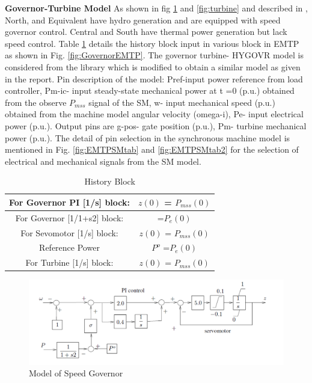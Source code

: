 \documentclass{report}
\begin{document}
\textbf{Governor-Turbine Model}
As shown in fig \ref{fig:Speed} and \ref{fig:turbine} and described in \cite{van2015test}, North, and Equivalent have hydro generation and are equipped with speed governor control. Central and South have thermal power generation but lack speed control. Table \ref{tab:HistoryGovTurbine} details the history block input in various block in EMTP as shown in Fig. \ref{fig:GovernorEMTP}. The governor turbine- HYGOVR model is considered from the library which is modified to obtain a similar model as given in the report. Pin description of the model: Pref-input power reference from load controller, Pm-ic- input steady-state mechanical power at t =0 (p.u.) obtained from the observe $P_{mss}$ signal of the SM, w- input mechanical speed (p.u.) obtained from the machine model angular velocity (omega-i), Pe- input electrical power (p.u.). Output pins are g-pos- gate position (p.u.), Pm- turbine mechanical power (p.u.). The detail of pin selection in the synchronous machine model is mentioned in Fig. \ref{fig:EMTPSMtab} and \ref{fig:EMTPSMtab2} for the selection of electrical and mechanical signals from the SM model. 

 \begin{table}[H]
\centering
\caption{History Block}
\begin{tabular}{|c|c|}
    \hline
For Governor PI [1/s] block: & $z(0)$ = $P_{mss}(0) $ \\
    \hline
For Governor  [1/1+s2] block: & =$P_e(0)$  \\
\hline
For Sevomotor  [1/s] block: & $z(0)$ = $P_{mss}(0) $ \\
\hline
Reference Power &$P^o$ =$P_e(0)$ \\
\hline
For Turbine  [1/s] block: & $z(0)$ = $P_{mss}(0) $ \\
    \hline
\end{tabular}
\label{tab:HistoryGovTurbine}
\end{table}

\begin{figure}
    \centering
    \includegraphics[width=0.7\linewidth]{Figure_Nordic/SpeedGovernor.png}
    \caption{Model of Speed Governor}
    \label{fig:Speed}
\end{figure}
\end{document}
